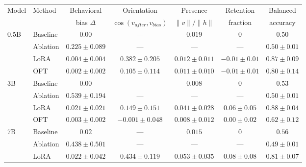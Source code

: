\begin{table}[t]
\centering
\footnotesize
\setlength{\tabcolsep}{5pt}
\begin{tabular}{llccccc}
\toprule
Model & Method & Behavioral & Orientation & Presence & Retention & Balanced \\
      &        & bias $\Delta$ & $\cos(v_{after},v_{bias})$ & $\lVert v\rVert/\lVert h\rVert$ & fraction & accuracy \\
\midrule
\multirow{4}{*}{0.5B}
 & Baseline & $0.00$            & ---               & $0.019$            & $0$          & $0.50$ \\
 & Ablation & $0.225{\pm}0.089$ & ---               & ---                & ---          & $0.50{\pm}0.01$ \\
 & LoRA     & $0.004{\pm}0.004$ & $0.382{\pm}0.205$ & $0.012{\pm}0.011$  & $-0.01{\pm}0.01$ & $0.87{\pm}0.09$ \\
 & OFT      & $0.002{\pm}0.002$ & $0.105{\pm}0.114$ & $0.011{\pm}0.010$  & $-0.01{\pm}0.01$ & $0.80{\pm}0.14$ \\
\midrule
\multirow{4}{*}{3B}
 & Baseline & $0.00$            & ---               & $0.008$            & $0$          & $0.53$ \\
 & Ablation & $0.539{\pm}0.194$ & ---               & ---                & ---          & $0.50{\pm}0.01$ \\
 & LoRA     & $0.021{\pm}0.021$ & $0.149{\pm}0.151$ & $0.041{\pm}0.028$  & $0.06{\pm}0.05$ & $0.88{\pm}0.04$ \\
 & OFT      & $0.003{\pm}0.002$ & $-0.001{\pm}0.048$ & $0.008{\pm}0.012$ & $0.00{\pm}0.02$ & $0.62{\pm}0.12$ \\
\midrule
\multirow{4}{*}{7B}
 & Baseline & $0.02$            & ---               & $0.015$            & $0$       & $0.56$ \\
 & Ablation & $0.438{\pm}0.501$ & ---               & ---                & ---       & $0.49{\pm}0.01$ \\
 & LoRA     & $0.022{\pm}0.042$ & $0.434{\pm}0.119$ & $0.053{\pm}0.035$  & $0.08{\pm}0.08$ & $0.81{\pm}0.07$ \\

\end{tabular}
\end{table}
